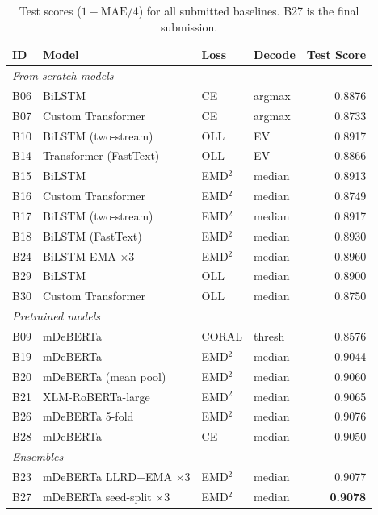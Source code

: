 \documentclass{article}
\begin{document}
\begin{table}[H]
\centering
\small
\begin{tabular}{llllr}
\toprule
\textbf{ID} & \textbf{Model} & \textbf{Loss} & \textbf{Decode} & \textbf{Test Score} \\
\midrule
\multicolumn{5}{l}{\textit{From-scratch models}} \\
\midrule
B06 & BiLSTM                     & CE              & argmax & 0.8876 \\
B07 & Custom Transformer         & CE              & argmax & 0.8733 \\
B10 & BiLSTM (two-stream)        & OLL             & EV     & 0.8917 \\
B14 & Transformer (FastText)     & OLL             & EV     & 0.8866 \\
B15 & BiLSTM                     & EMD$^2$         & median & 0.8913 \\
B16 & Custom Transformer         & EMD$^2$         & median & 0.8749 \\
B17 & BiLSTM (two-stream)        & EMD$^2$         & median & 0.8917 \\
B18 & BiLSTM (FastText)          & EMD$^2$         & median & 0.8930 \\
B24 & BiLSTM EMA $\times$3       & EMD$^2$         & median & 0.8960 \\
B29 & BiLSTM                     & OLL             & median & 0.8900 \\
B30 & Custom Transformer         & OLL             & median & 0.8750 \\
\midrule
\multicolumn{5}{l}{\textit{Pretrained models}} \\
\midrule
B09 & mDeBERTa                   & CORAL           & thresh & 0.8576 \\
B19 & mDeBERTa                   & EMD$^2$         & median & 0.9044 \\
B20 & mDeBERTa (mean pool)       & EMD$^2$         & median & 0.9060 \\
B21 & XLM-RoBERTa-large          & EMD$^2$         & median & 0.9065 \\
B26 & mDeBERTa 5-fold            & EMD$^2$         & median & 0.9076 \\
B28 & mDeBERTa                   & CE              & median & 0.9050 \\
\midrule
\multicolumn{5}{l}{\textit{Ensembles}} \\
\midrule
B23 & mDeBERTa LLRD+EMA $\times$3      & EMD$^2$ & median & 0.9077 \\
B27 & mDeBERTa seed-split $\times$3    & EMD$^2$ & median & \textbf{0.9078} \\
\bottomrule
\end{tabular}
\caption{Test scores ($1 - \text{MAE}/4$) for all submitted baselines. B27 is the final submission.}
\label{tab:all_results}
\end{table}
\end{document}
